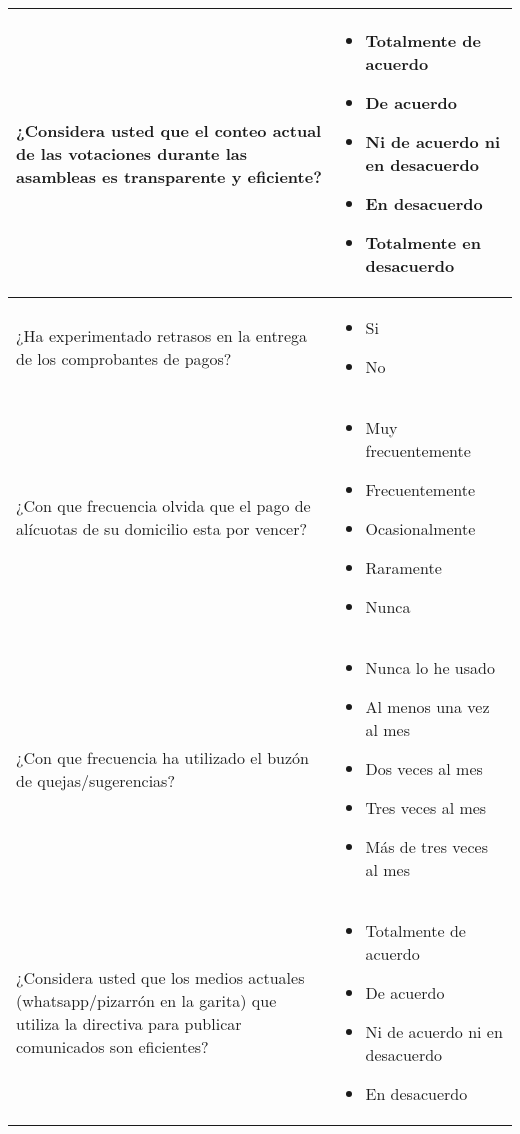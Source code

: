 \begin{footnotesize}
\begin{center}
\begin{longtable}[c]{|p{}|p{}|}
			\hline
			¿Considera usted que el conteo actual de las votaciones durante las asambleas es transparente y eficiente? &
			\begin{itemize}
				\item Totalmente de acuerdo
				\item De acuerdo
				\item Ni de acuerdo ni en desacuerdo
				\item En desacuerdo
				\item Totalmente en desacuerdo
			\end{itemize} \\
			\hline
			¿Ha experimentado retrasos en la entrega de los comprobantes de pagos? &
			\begin{itemize}
				\item Si
				\item No
			\end{itemize} \\
			\hline
			¿Con que frecuencia olvida que el pago de alícuotas de su domicilio esta por vencer? &
			\begin{itemize}
				\item Muy frecuentemente
				\item Frecuentemente
				\item Ocasionalmente
				\item Raramente
				\item Nunca
			\end{itemize}\\
			\hline
			¿Con que frecuencia ha utilizado el buzón de quejas/sugerencias? &
			\begin{itemize}
				\item Nunca lo he usado
				\item Al menos una vez al mes
				\item Dos veces al mes
				\item Tres veces al mes
				\item Más de tres veces al mes
			\end{itemize} \\
			\hline
			¿Considera usted que los medios actuales (whatsapp/pizarrón en la garita) que utiliza la directiva para publicar comunicados son eficientes? &
			\begin{itemize}
				\item Totalmente de acuerdo
				\item De acuerdo
				\item Ni de acuerdo ni en desacuerdo
				\item En desacuerdo

\end{itemize}
\end{longtable}
\end{center}
\end{footnotesize}
